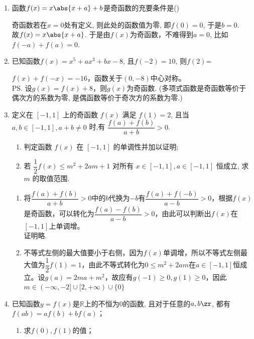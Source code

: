 \begin{enumerate}
    \item 函数$f(x)=x\abs{x+a}+b$是奇函数的充要条件是\dotfill()
    \begin{jieda}
    奇函数若在$x=0$处有定义, 则此处的函数值为零, 即$f(0)=0$, 于是$b=0$. \\
    故$f(x)=x\abs{x+a}$. 于是由$f(x)$为奇函数，不难得到$a=0$, 比如$f(-a)+f(a)=0$. 
    \end{jieda}
    \item 已知函数$f(x)=x^5+ax^3+bx-8$, 且$f(-2)=10$, 则$f(2)$=
    \begin{jieda}
    $f(x)+f(-x)=-16$，函数关于$(0, -8)$中心对称。\\
    \ps 设$g(x) = f(x)+8$，则$g(x)$为奇函数. (多项式函数是奇函数等价于偶次方的系数为零, 是偶函数等价于奇次方的系数为零.)
    \end{jieda}
    \item 定义在 $[-1,1]$ 上的奇函数 $f(x)$ 满足 $f(1)=2$, 且当 $a, b \in[-1,1], a+b \neq 0$ 时,有 $\dfrac{f(a)+f(b)}{a+b}>0$.
    \begin{enumerate}
        \item 判定函数 $f(x)$ 在 $[-1,1]$ 的单调性并加以证明;
        \item 若 $\dfrac{1}{2} f(x) \leq m^2+2 a m+1$ 对所有 $x \in[-1,1], a \in[-1,1]$ 恒成立, 求 $m$ 的取值范围.
    \end{enumerate}
    \begin{jieda}
        \begin{enumerate}
            \item 将$\dfrac{f(a)+f(b)}{a+b}>0$中的$b$代换为$-b$有$\dfrac{f(a)+f(-b)}{a-b}>0$，根据$f(x)$是奇函数，可以转化为$\dfrac{f(a)-f(b)}{a-b}>0$，由此可以判断出$f(x)$在$[-1, 1]$上单调增。 \\
            证明略.
            \item 不等式左侧的最大值要小于右侧，因为$f(x)$单调增，所以不等式左侧最大值为$\dfrac{1}{2}f(1) = 1$，由此不等式转化为$0 \leq m^2 + 2am$在$a \in [-1, 1]$恒成立。设$g(a) = 2ma+m^2$，故应有$g(-1) \geq 0, g(1) \geq 0$，因此$m \in (-\infty, -2] \cup [2, +\infty) \cup \{0\}$
        \end{enumerate}
    \end{jieda}
    \item 已知函数$y=f(x)$是$\mathbb{R}$上的不恒为0的函数, 且对于任意的$a,b\zr$, 都有$f(ab)=af(b)+bf(a)$；
    \begin{enumerate}
        \item 求$f(0), f(1)$的值；

\end{enumerate}
\end{enumerate}
